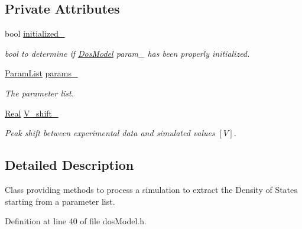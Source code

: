 \subsection*{Private Attributes}
\begin{DoxyCompactItemize}
\item 
\hypertarget{classDosModel_aef7436a220692b5b863db4e9d8b870a3}{bool \hyperlink{classDosModel_aef7436a220692b5b863db4e9d8b870a3}{initialized\-\_\-}}\label{classDosModel_aef7436a220692b5b863db4e9d8b870a3}

\begin{DoxyCompactList}\small\item\em bool to determine if \hyperlink{classDosModel}{Dos\-Model} {\itshape param\-\_\-} has been properly initialized. \end{DoxyCompactList}\item 
\hypertarget{classDosModel_a4deb2401e648f5ad79e0aab68343a96b}{\hyperlink{classParamList}{Param\-List} \hyperlink{classDosModel_a4deb2401e648f5ad79e0aab68343a96b}{params\-\_\-}}\label{classDosModel_a4deb2401e648f5ad79e0aab68343a96b}

\begin{DoxyCompactList}\small\item\em The parameter list. \end{DoxyCompactList}\item 
\hypertarget{classDosModel_afd8e6e3c2312d733b446fce08daf48e9}{\hyperlink{typedefs_8h_a060b837c3b4486ee35317744156f3da2}{Real} \hyperlink{classDosModel_afd8e6e3c2312d733b446fce08daf48e9}{V\-\_\-shift\-\_\-}}\label{classDosModel_afd8e6e3c2312d733b446fce08daf48e9}

\begin{DoxyCompactList}\small\item\em Peak shift between experimental data and simulated values $ [V] $. \end{DoxyCompactList}\end{DoxyCompactItemize}


\subsection{Detailed Description}
Class providing methods to process a simulation to extract the Density of States starting from a parameter list. 

Definition at line 40 of file dos\-Model.\-h.



